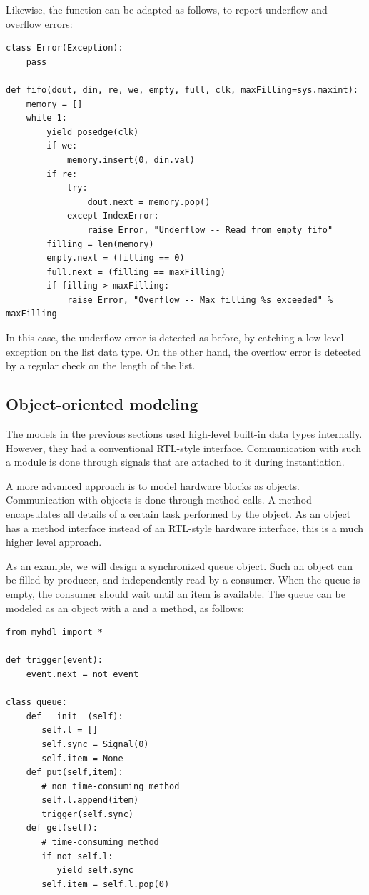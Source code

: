 Likewise, the  function can be adapted as follows, to
report underflow and overflow errors:

\begin{verbatim}
class Error(Exception):
    pass

def fifo(dout, din, re, we, empty, full, clk, maxFilling=sys.maxint):
    memory = []
    while 1:
        yield posedge(clk)
        if we:
            memory.insert(0, din.val)
        if re:
            try:
                dout.next = memory.pop()
            except IndexError:
                raise Error, "Underflow -- Read from empty fifo"
        filling = len(memory)
        empty.next = (filling == 0)
        full.next = (filling == maxFilling)
        if filling > maxFilling:
            raise Error, "Overflow -- Max filling %s exceeded" % maxFilling
\end{verbatim}

In this case, the underflow error is detected as before, by catching a
low level exception on the list data type. On the other hand, the
overflow error is detected by a regular check on the length of the
list.


\subsection{Object-oriented modeling \label{model-obj}}

The models in the previous sections used high-level built-in data
types internally. However, they had a conventional RTL-style
interface.  Communication with such a module is done through signals
that are attached to it during instantiation.

A more advanced approach is to model hardware blocks as
objects. Communication with objects is done through method calls.
A method encapsulates all details of a certain task performed
by the object. As an object has a method interface instead
of an RTL-style hardware interface, this is a much 
higher level approach.

As an example, we will design a synchronized queue object. 
Such an object can be filled by producer, and independently
read by a consumer. When the queue is empty, the consumer
should wait until an item is available. The queue can be modeled
as an object with a  and a 
method, as follows:

\begin{verbatim}
from myhdl import *

def trigger(event):
    event.next = not event

class queue:
    def __init__(self):
       self.l = []
       self.sync = Signal(0)
       self.item = None
    def put(self,item):
       # non time-consuming method
       self.l.append(item)
       trigger(self.sync)
    def get(self):
       # time-consuming method
       if not self.l:
          yield self.sync
       self.item = self.l.pop(0)
\end{verbatim}

